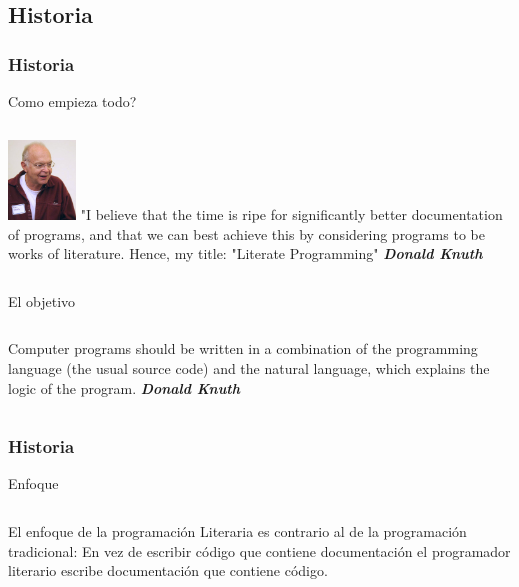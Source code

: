 \documentclass[sans serif,9pt,xcolor=dvipsnames]{beamer}%
\begin{document}
\subsection{Historia}
\begin{frame}
\frametitle{Historia}
\begin{block}{Como empieza todo?}
\begin{columns}
 \hspace{0.7cm}
\includegraphics[width=1.8cm]{imagenes/donald.jpg}
\justifying
"I believe that the time is ripe for significantly better documentation of programs, and that we can best achieve this by considering programs to be works of literature. Hence, my title: "Literate Programming" \textbf{\textit{Donald Knuth}}
\end{columns}
\end{block}

\begin{block}{El objetivo}
\begin{columns}
 \hspace{0.7cm}
\justifying
Computer programs should be written in a combination of the programming language (the usual source code) and the natural language, which explains the logic of the program. \textbf{\textit{Donald Knuth}}
\end{columns}
\end{block}

\end{frame}

\begin{frame}
\frametitle{Historia}
\begin{block}{Enfoque}
\begin{columns}
 \hspace{0.7cm}
\justifying
El enfoque de la programación Literaria es contrario al de la programación tradicional: En vez de escribir código que contiene documentación el programador literario escribe documentación que contiene código.
\end{columns}
\end{block}
\end{frame}
\end{document}
